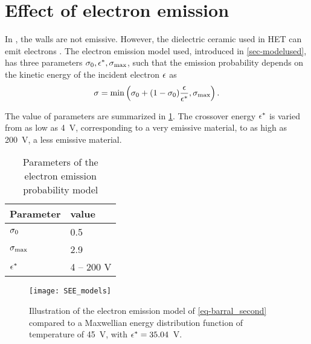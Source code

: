 
\section{Effect of electron emission}
  \label{sec-see}
  
  In , the walls are not emissive.
  However, the dielectric ceramic used in \ac{HET} can emit electrons \citep{villemant2018,barral2003a}.
  The electron emission model used, introduced in \cref{sec-modelused}, has three parameters $\sigma _0, \epsilon^{*}, \sigma _{\rm max} $, such that the emission probability depends on the kinetic energy of the incident electron $\epsilon$ as
  \begin{equation} \label{eq-barral_second}
    \sigma  = \min \left( \sigma _0 + (1 -  \sigma _0) \frac{\epsilon}{\epsilon^{*}}, \sigma _{\rm max}     \right).
  \end{equation}
  
  The value of parameters are summarized in \cref{tab-tabe_parameters_see}.
  The crossover energy $\epsilon^{*}$ is varied from as low as 4~V, corresponding to a very emissive material, to as high as 200~V, a less emissive material.
  
  \begin{table}[hbtp]
    \centering
    \caption{Parameters of the electron emission probability model}
    \label{tab-tabe_parameters_see}
    \begin{tabular}{@{}ll@{}} \toprule
    Parameter & value  \\ \midrule
    $\sigma _0$ & 0.5  \\
    $\sigma _{\rm max} $ & 2.9 \\
    $\epsilon^{*}$   &  4  -- 200 V\\
    \bottomrule
    \end{tabular}
  \end{table}
  
  \begin{figure}[hbtp]
    \centering
    \texttt{[image: SEE\_models]}
    \caption{Illustration of the electron emission model of \cref{eq-barral_second} compared to a Maxwellian energy distribution function of temperature of 45~V, with $\epsilon^{*}=35.04$~V.}
    \label{fig-see_illustration}
  \end{figure}
  
